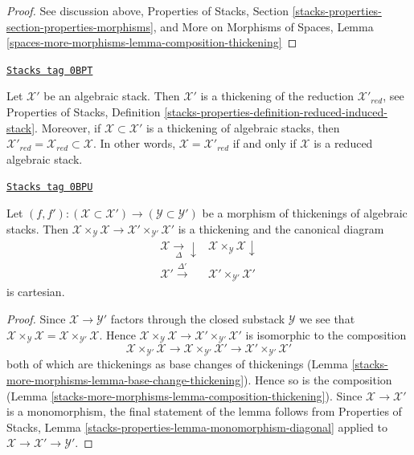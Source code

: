 \begin{proof}
See discussion above, Properties of Stacks, Section
\ref{stacks-properties-section-properties-morphisms}, and
More on Morphisms of Spaces, Lemma
\ref{spaces-more-morphisms-lemma-composition-thickening}
\end{proof}

\begin{example}
\label{stacks-more-morphisms-example-reduction-thickening}
\href{https://stacks.math.columbia.edu/tag/0BPT}{\texttt{Stacks tag 0BPT}}

Let $\mathcal{X}'$ be an algebraic stack. Then $\mathcal{X}'$ is a thickening
of the reduction $\mathcal{X}'_{red}$, see
Properties of Stacks, Definition
\ref{stacks-properties-definition-reduced-induced-stack}.
Moreover, if $\mathcal{X} \subset \mathcal{X}'$ is a thickening
of algebraic stacks, then
$\mathcal{X}'_{red} = \mathcal{X}_{red} \subset \mathcal{X}$.
In other words, $\mathcal{X} = \mathcal{X}'_{red}$ if and only
if $\mathcal{X}$ is a reduced algebraic stack.
\end{example}

\begin{lemma}
\label{stacks-more-morphisms-lemma-reduced-diagonal}
\href{https://stacks.math.columbia.edu/tag/0BPU}{\texttt{Stacks tag 0BPU}}

Let $(f, f') : (\mathcal{X} \subset \mathcal{X}') \to
(\mathcal{Y} \subset \mathcal{Y}')$ be a morphism of thickenings
of algebraic stacks. Then
$\mathcal{X} \times_\mathcal{Y} \mathcal{X} \to
\mathcal{X}' \times_{\mathcal{Y}'} \mathcal{X}'$
is a thickening and the canonical diagram
$$
\begin{array}{cc}\mathcal{X} \underset{\Delta}{\longrightarrow}\downarrow & \mathcal{X} \times_\mathcal{Y} \mathcal{X} \downarrow \\ \mathcal{X}' \overset{\Delta'}{\longrightarrow} & \mathcal{X}' \times_{\mathcal{Y}'} \mathcal{X}'\end{array}
$$
is cartesian.
\end{lemma}

\begin{proof}
Since $\mathcal{X} \to \mathcal{Y}'$ factors through the closed
substack $\mathcal{Y}$ we see that
$\mathcal{X} \times_\mathcal{Y} \mathcal{X} =
\mathcal{X} \times_{\mathcal{Y}'} \mathcal{X}$.
Hence
$\mathcal{X} \times_\mathcal{Y} \mathcal{X} \to
\mathcal{X}' \times_{\mathcal{Y}'} \mathcal{X}'$
is isomorphic to the composition
$$
\mathcal{X} \times_{\mathcal{Y}'} \mathcal{X} \to
\mathcal{X} \times_{\mathcal{Y}'} \mathcal{X}' \to
\mathcal{X}' \times_{\mathcal{Y}'} \mathcal{X}'
$$
both of which are thickenings as base changes of thickenings
(Lemma \ref{stacks-more-morphisms-lemma-base-change-thickening}).
Hence so is the composition
(Lemma \ref{stacks-more-morphisms-lemma-composition-thickening}).
Since $\mathcal{X} \to \mathcal{X}'$ is a monomorphism,
the final statement of the lemma follows from
Properties of Stacks, Lemma
\ref{stacks-properties-lemma-monomorphism-diagonal}
applied to $\mathcal{X} \to \mathcal{X}' \to \mathcal{Y}'$.
\end{proof}

